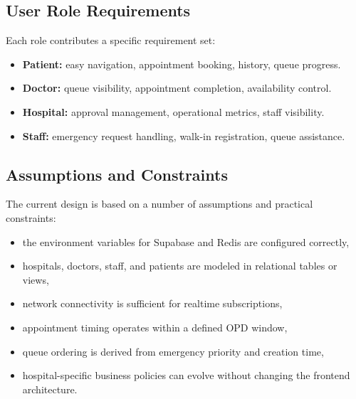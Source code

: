 \documentclass[12pt,onecolumn]{IEEEtran}
\begin{document}
\subsection{User Role Requirements}
Each role contributes a specific requirement set:
\begin{itemize}
    \item \textbf{Patient:} easy navigation, appointment booking, history, queue progress.
    \item \textbf{Doctor:} queue visibility, appointment completion, availability control.
    \item \textbf{Hospital:} approval management, operational metrics, staff visibility.
    \item \textbf{Staff:} emergency request handling, walk-in registration, queue assistance.
\end{itemize}

\subsection{Assumptions and Constraints}
The current design is based on a number of assumptions and practical constraints:
\begin{itemize}
    \item the environment variables for Supabase and Redis are configured correctly,
    \item hospitals, doctors, staff, and patients are modeled in relational tables or views,
    \item network connectivity is sufficient for realtime subscriptions,
    \item appointment timing operates within a defined OPD window,
    \item queue ordering is derived from emergency priority and creation time,
    \item hospital-specific business policies can evolve without changing the frontend architecture.
\end{itemize}
\end{document}
